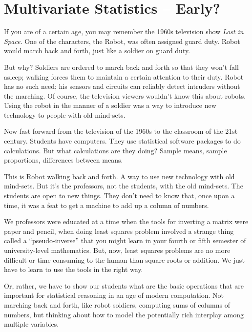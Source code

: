 \chapter{Multivariate Statistics -- Early?} 
\label{chap:multivariate-early}







If you are of a certain age, you may remember the 1960s television show {\em
  Lost in Space}.  One of the characters, the Robot, was often
assigned guard duty.  Robot would march back and forth, just like a
soldier on guard duty.

But why?  Soldiers are ordered to march back and forth so that they
won't fall asleep; walking forces them to maintain a certain attention
to their duty.  Robot has no such need; his sensors and circuits can reliably
detect intruders without the marching.  Of course, the television
viewers wouldn't know this about robots.  Using the robot in the
manner of a soldier was a way to introduce new technology to people
with old mind-sets.

Now fast forward from the television of the 1960s to the classroom of
the 21st century.  Students have computers.  They use statistical
software packages to do calculations.  But what calculations are they
doing?  Sample means, sample proportions, differences between means.

This is Robot walking back and forth.  A way to use new technology with
old mind-sets.  But it's the professors, not the students, with the
old mind-sets.  The students are open to new things.  They don't need
to know that, once upon a time, it was a feat to get a machine to add
up a column of numbers.

We professors were educated at a time when the tools for inverting a
matrix were paper and pencil, when doing least squares problem involved
a strange thing called a ``pseudo-inverse'' that you might learn in
your fourth or fifth semester of university-level mathematics.  But, now, least squares
problems are no more difficult or time consuming to the human than
square roots or addition.  We just have to learn to use the tools in
the right way.  

Or, rather, we have to show our students what are the
basic operations that are important for statistical reasoning in an
age of modern computation.  Not marching back and forth, like robot
soldiers, computing sums of columns of numbers, but thinking about how to model the
potentially rich interplay among multiple variables.

